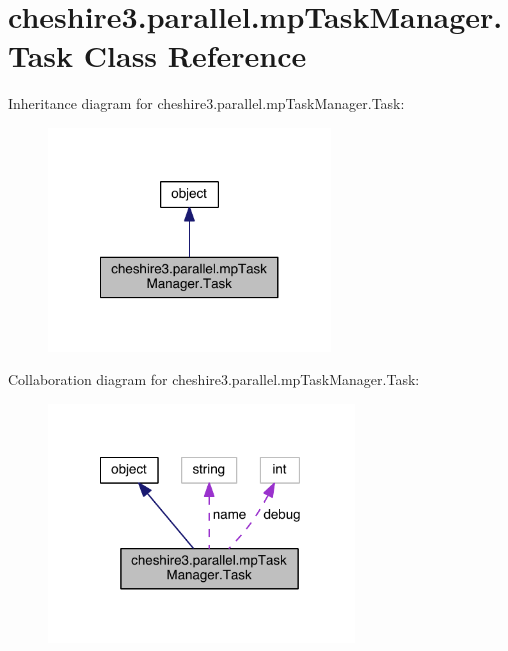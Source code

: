 \hypertarget{classcheshire3_1_1parallel_1_1mp_task_manager_1_1_task}{\section{cheshire3.\-parallel.\-mp\-Task\-Manager.\-Task Class Reference}
\label{classcheshire3_1_1parallel_1_1mp_task_manager_1_1_task}
}


Inheritance diagram for cheshire3.\-parallel.\-mp\-Task\-Manager.\-Task\-:
\nopagebreak
\begin{figure}[H]
\begin{center}
\leavevmode
\includegraphics[width=212pt]{classcheshire3_1_1parallel_1_1mp_task_manager_1_1_task__inherit__graph}
\end{center}
\end{figure}


Collaboration diagram for cheshire3.\-parallel.\-mp\-Task\-Manager.\-Task\-:
\nopagebreak
\begin{figure}[H]
\begin{center}
\leavevmode
\includegraphics[width=230pt]{classcheshire3_1_1parallel_1_1mp_task_manager_1_1_task__coll__graph}
\end{center}
\end{figure}
